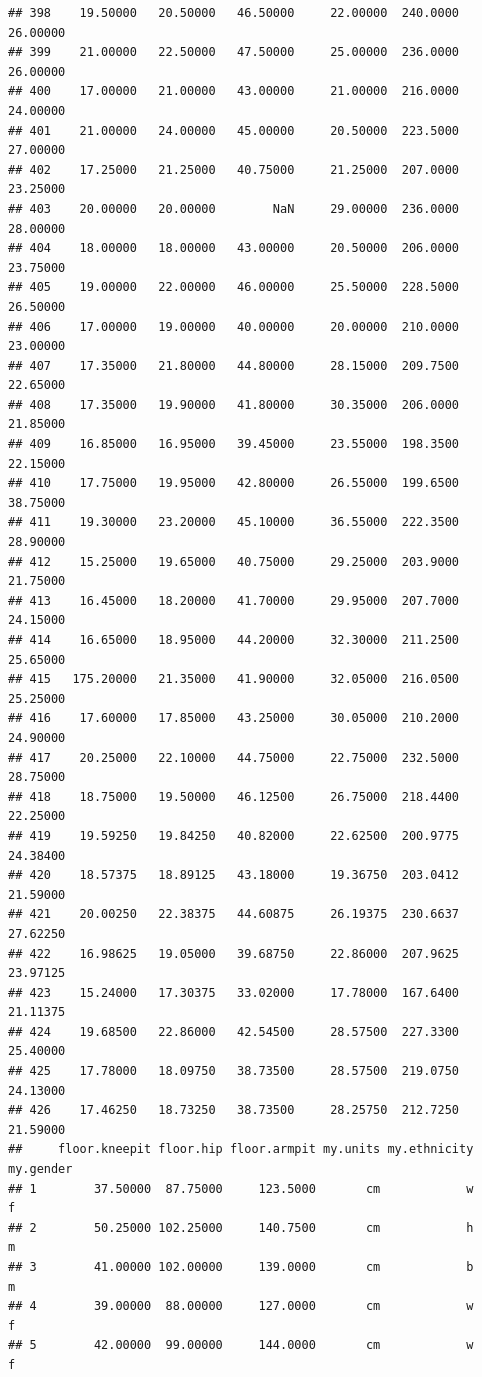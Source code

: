 \documentclass[]{article}
\begin{document}
\begin{verbatim}
## 398    19.50000   20.50000   46.50000     22.00000  240.0000    26.00000
## 399    21.00000   22.50000   47.50000     25.00000  236.0000    26.00000
## 400    17.00000   21.00000   43.00000     21.00000  216.0000    24.00000
## 401    21.00000   24.00000   45.00000     20.50000  223.5000    27.00000
## 402    17.25000   21.25000   40.75000     21.25000  207.0000    23.25000
## 403    20.00000   20.00000        NaN     29.00000  236.0000    28.00000
## 404    18.00000   18.00000   43.00000     20.50000  206.0000    23.75000
## 405    19.00000   22.00000   46.00000     25.50000  228.5000    26.50000
## 406    17.00000   19.00000   40.00000     20.00000  210.0000    23.00000
## 407    17.35000   21.80000   44.80000     28.15000  209.7500    22.65000
## 408    17.35000   19.90000   41.80000     30.35000  206.0000    21.85000
## 409    16.85000   16.95000   39.45000     23.55000  198.3500    22.15000
## 410    17.75000   19.95000   42.80000     26.55000  199.6500    38.75000
## 411    19.30000   23.20000   45.10000     36.55000  222.3500    28.90000
## 412    15.25000   19.65000   40.75000     29.25000  203.9000    21.75000
## 413    16.45000   18.20000   41.70000     29.95000  207.7000    24.15000
## 414    16.65000   18.95000   44.20000     32.30000  211.2500    25.65000
## 415   175.20000   21.35000   41.90000     32.05000  216.0500    25.25000
## 416    17.60000   17.85000   43.25000     30.05000  210.2000    24.90000
## 417    20.25000   22.10000   44.75000     22.75000  232.5000    28.75000
## 418    18.75000   19.50000   46.12500     26.75000  218.4400    22.25000
## 419    19.59250   19.84250   40.82000     22.62500  200.9775    24.38400
## 420    18.57375   18.89125   43.18000     19.36750  203.0412    21.59000
## 421    20.00250   22.38375   44.60875     26.19375  230.6637    27.62250
## 422    16.98625   19.05000   39.68750     22.86000  207.9625    23.97125
## 423    15.24000   17.30375   33.02000     17.78000  167.6400    21.11375
## 424    19.68500   22.86000   42.54500     28.57500  227.3300    25.40000
## 425    17.78000   18.09750   38.73500     28.57500  219.0750    24.13000
## 426    17.46250   18.73250   38.73500     28.25750  212.7250    21.59000
##     floor.kneepit floor.hip floor.armpit my.units my.ethnicity my.gender
## 1        37.50000  87.75000     123.5000       cm            w         f
## 2        50.25000 102.25000     140.7500       cm            h         m
## 3        41.00000 102.00000     139.0000       cm            b         m
## 4        39.00000  88.00000     127.0000       cm            w         f
## 5        42.00000  99.00000     144.0000       cm            w         f

\end{verbatim}
\end{document}
